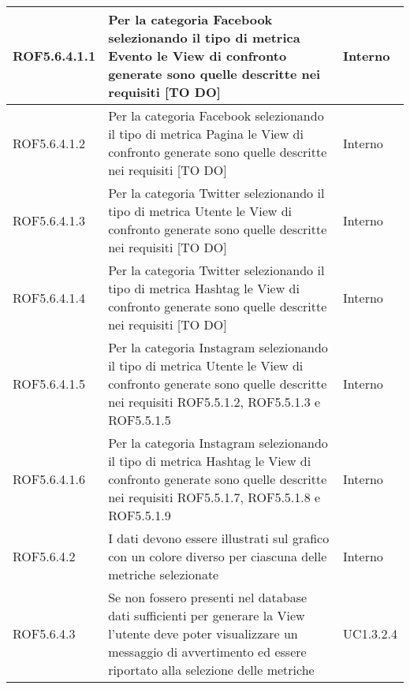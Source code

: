 \begin{center}
\begin{longtable}{| p{2.5cm} | p{8cm} | p{2cm} |}
		\hline
		ROF5.6.4.1.1  &  Per la categoria Facebook selezionando il tipo di metrica Evento le View di confronto generate sono quelle descritte nei requisiti [TO DO] &  Interno \\
		\hline
		ROF5.6.4.1.2  &  Per la categoria Facebook selezionando il tipo di metrica Pagina le View di confronto generate sono quelle descritte nei requisiti [TO DO] &  Interno \\
		\hline
		ROF5.6.4.1.3  &  Per la categoria Twitter selezionando il tipo di metrica Utente le View di confronto generate sono quelle descritte nei requisiti [TO DO] &  Interno \\
		\hline
		ROF5.6.4.1.4  &  Per la categoria Twitter selezionando il tipo di metrica Hashtag le View di confronto generate sono quelle descritte nei requisiti [TO DO] &  Interno \\
		\hline
		ROF5.6.4.1.5  &  Per la categoria Instagram selezionando il tipo di metrica Utente le View di confronto generate sono quelle descritte nei requisiti ROF5.5.1.2, ROF5.5.1.3 e ROF5.5.1.5 &  Interno \\
		\hline
		ROF5.6.4.1.6  &  Per la categoria Instagram selezionando il tipo di metrica Hashtag le View di confronto generate sono quelle descritte nei requisiti ROF5.5.1.7, ROF5.5.1.8 e ROF5.5.1.9  &  Interno \\
		\hline
		ROF5.6.4.2  &  I dati devono essere illustrati sul grafico con un colore diverso per ciascuna delle metriche selezionate  &  Interno \\
		\hline
		ROF5.6.4.3  &  Se non fossero presenti nel database dati sufficienti per generare la View l'utente deve poter visualizzare un messaggio di avvertimento ed essere riportato alla selezione delle metriche  &  UC1.3.2.4 \\
		\hline



\end{longtable}
\end{center}
